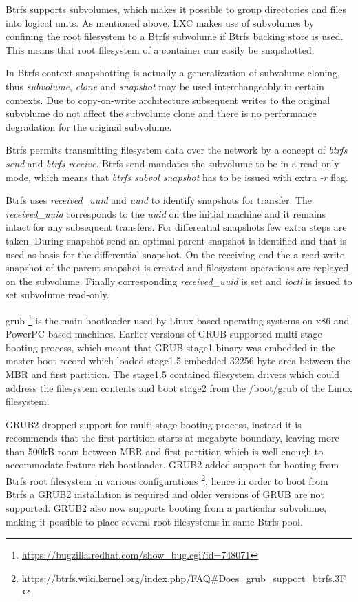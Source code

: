 \documentclass[a4paper,11pt]{kth-mag}
\begin{document}
Btrfs supports subvolumes, which makes it possible to group
directories and files into logical units.
As mentioned above, LXC makes use of subvolumes
by confining the root filesystem to a Btrfs subvolume
if Btrfs backing store is used.
This means that root filesystem of a container
can easily be snapshotted.

In Btrfs context snapshotting is actually 
a generalization of subvolume cloning,
thus \emph{subvolume}, \emph{clone} and \emph{snapshot} may be used
interchangeably in certain contexts.
Due to copy-on-write architecture subsequent writes
to the original subvolume do not affect
the subvolume clone and there is no performance
degradation for the original subvolume.

Btrfs permits transmitting filesystem data over the network
by a concept of \emph{btrfs send} and \emph{btrfs receive}.
Btrfs send mandates the subvolume to be in a read-only mode,
which means that \emph{btrfs subvol snapshot} has to be issued
with extra \emph{-r} flag.


Btrfs uses \emph{received\_uuid} and \emph{uuid} to
identify snapshots for transfer.
The \emph{received\_uuid} corresponds to the \emph{uuid} on
the initial machine and it remains intact for any subsequent transfers.
For differential snapshots few extra steps are taken.
During snapshot send an optimal parent snapshot is
identified and that is used as basis for the differential snapshot.
On the receiving end the a read-write snapshot of the parent
snapshot is created and filesystem operations
are replayed on the subvolume.
Finally corresponding \emph{received\_uuid} is set and
\emph{ioctl} is issued to set subvolume read-only.


\gls{grub}
\footnote{\url{https://bugzilla.redhat.com/show_bug.cgi?id=748071}}
is the main bootloader used
by Linux-based operating systems on x86 and PowerPC based machines.
Earlier versions of GRUB supported multi-stage booting process,
which meant that GRUB stage1 binary was embedded in the
master boot record which loaded stage1.5 embedded
32256 byte area between the MBR and first partition.
The stage1.5 contained filesystem drivers which could
address the filesystem contents and boot stage2 from
the /boot/grub of the Linux filesystem.

GRUB2 dropped support for multi-stage booting process,
instead it is recommends that the first partition
starts at megabyte boundary, leaving
more than 500kB room between MBR
and first partition which is well enough to accommodate
feature-rich bootloader.
GRUB2 added support for booting from Btrfs root filesystem
in various configurations
\footnote{\url{https://btrfs.wiki.kernel.org/index.php/FAQ\#Does_grub_support_btrfs.3F}},
hence in order to boot from
Btrfs a GRUB2 installation is required and older versions of
GRUB are not supported.
GRUB2 also now supports booting from a particular subvolume,
making it possible to place several root filesystems
in same Btrfs pool.
\end{document}
